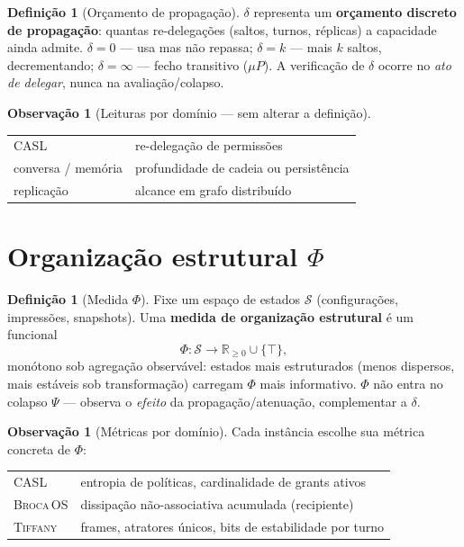 \documentclass[11pt]{article}
\newcommand{\SO}{\textsc{Broca\,OS}}
\newcommand{\Tiffany}{\textsc{Tiffany}}
\theoremstyle{definition}
\newtheorem{definition}[theorem]{Definição}
\newtheorem{remark}[theorem]{Observação}
\newcommand{\dep}{\delta}
\newcommand{\Phif}{\Phi}
\begin{document}
\begin{definition}[Orçamento de propagação]\label{def:delta-budget}
$\dep$ representa um \textbf{orçamento discreto de propagação}: quantas
re-delegações (saltos, turnos, réplicas) a capacidade ainda admite.
$\dep=0$ --- usa mas não repassa; $\dep=k$ --- mais $k$ saltos, decrementando;
$\dep=\infty$ --- fecho transitivo ($\mu P$). A verificação de $\dep$ ocorre
no \emph{ato de delegar}, nunca na avaliação/colapso.
\end{definition}

\begin{remark}[Leituras por domínio --- sem alterar a definição]
\begin{center}\small
\begin{tabular}{@{}ll@{}}
CASL & re-delegação de permissões \\
conversa / memória & profundidade de cadeia ou persistência \\
replicação & alcance em grafo distribuído \\
\end{tabular}
\end{center}
\end{remark}

\section{Organização estrutural $\Phif$}\label{sec:phi}

\begin{definition}[Medida $\Phif$]\label{def:phi-abstract}
Fixe um espaço de estados $\mathcal{S}$ (configurações, impressões, snapshots).
Uma \textbf{medida de organização estrutural} é um funcional
\[
  \Phif:\mathcal{S}\longrightarrow \mathbb{R}_{\ge 0}\cup\{\top\},
\]
monótono sob agregação observável: estados mais estruturados (menos
dispersos, mais estáveis sob transformação) carregam $\Phif$ mais
informativo. $\Phif$ não entra no colapso $\Psi$ --- observa o \emph{efeito}
da propagação/atenuação, complementar a $\dep$.
\end{definition}

\begin{remark}[Métricas por domínio]\label{rem:phi-metrics}
Cada instância escolhe sua métrica concreta de $\Phif$:
\begin{center}\small
\begin{tabular}{@{}ll@{}}
CASL & entropia de políticas, cardinalidade de grants ativos \\
\SO & dissipação não-associativa acumulada (recipiente) \\
\Tiffany & frames, atratores únicos, bits de estabilidade por turno \\
\end{tabular}
\end{center}
\end{remark}
\end{document}
